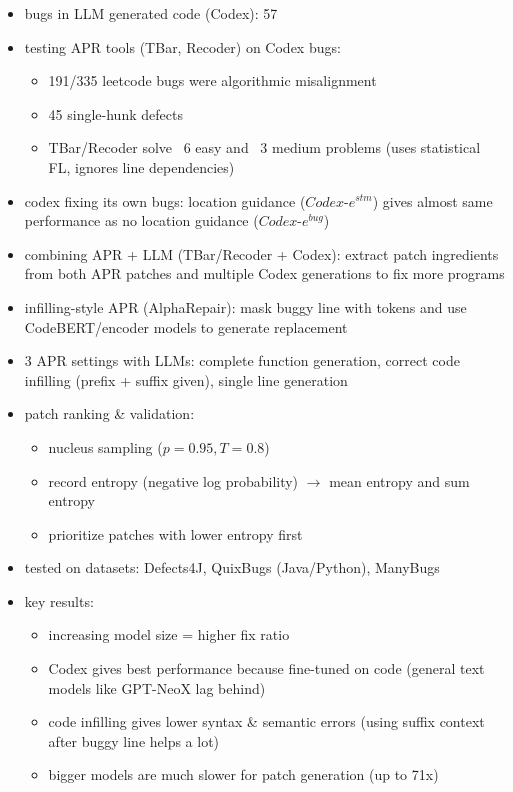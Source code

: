 \documentclass[11pt]{book}
\begin{document}
\begin{itemize}
\item bugs in LLM generated code (Codex): 57%
\item testing APR tools (TBar, Recoder) on Codex bugs:
\begin{itemize}
\item 191/335 leetcode bugs were algorithmic misalignment
\item 45 single-hunk defects
\item TBar/Recoder solve ~6 easy and ~3 medium problems (uses statistical FL, ignores line dependencies)
\end{itemize}
\item codex fixing its own bugs: location guidance ($Codex\text{-}e^{stm}$) gives almost same performance as no location guidance ($Codex\text{-}e^{bug}$)
\item combining APR + LLM (TBar/Recoder + Codex): extract patch ingredients from both APR patches and multiple Codex generations to fix more programs
\item infilling-style APR (AlphaRepair): mask buggy line with tokens and use CodeBERT/encoder models to generate replacement
\item 3 APR settings with LLMs: complete function generation, correct code infilling (prefix + suffix given), single line generation
\item patch ranking & validation:
\begin{itemize}
\item nucleus sampling ($p=0.95, T=0.8$)
\item record entropy (negative log probability) $\rightarrow$ mean entropy and sum entropy
\item prioritize patches with lower entropy first
\end{itemize}
\item tested on datasets: Defects4J, QuixBugs (Java/Python), ManyBugs
\item key results:
\begin{itemize}
\item increasing model size = higher fix ratio
\item Codex gives best performance because fine-tuned on code (general text models like GPT-NeoX lag behind)
\item code infilling gives lower syntax & semantic errors (using suffix context after buggy line helps a lot)
\item bigger models are much slower for patch generation (up to 71x)
\end{itemize}
\end{itemize}
\end{document}
